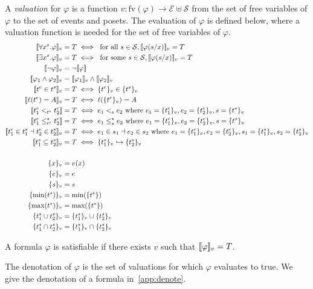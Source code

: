 A \emph{valuation} for $\varphi$ is a function
$v:\text{fv}(\varphi)\to\mathcal{E}\uplus\mathcal{S}$
from the set of free variables of $\varphi$ to the set of events and posets.
%
The evaluation of $\varphi$ is defined below, where a valuation function is needed for the set of free variables of $\varphi$.
\begin{align*}
  \enc{\forall x^s.\varphi}_{v} &= T \iff\text{ for all }s\in\mathcal{S}, \enc{\varphi(s/x)}_{v} = T\\
  \enc{\exists x^s.\varphi}_{v} &= T \iff\text{ for some }s\in\mathcal{S}, \enc{\varphi(s/x)}_{v} = T\\
  \enc{\neg\varphi}_v &= \neg\enc{\varphi} \\
  \enc{\varphi_1\wedge\varphi_2}_v &= \enc{\varphi_1}_v\wedge\enc{\varphi_2}_v\\
  \enc{t^e\in t^s}_v &= T\iff\enct{t^e}_v\in\enct{t^s}_v\\
  \enc{\labl(t^e) = A}_v &= T\iff\labl(\enct{t^e}_v)=A\\
  \enc{t^e_1 <_{t^s} t^e_2} &= T\iff e_1 <_s e_2\text{ where }e_1 = \enct{t^e_1}_v,e_2 = \enct{t^e_2}_v,s = \enct{t^s}_v\\
  \enc{t^e_1 \tleq_{t^s} t^e_2} &= T\iff e_1 \tleq_s e_2\text{ where }e_1 = \enct{t^e_1}_v,e_2 = \enct{t^e_2}_v,s = \enct{t^s}_v\\
  \enc{t^e_1\in t^s_1 \dashv t^e_2\in t^s_2}_v &= T\iff e_1\in s_1 \dashv e_2\in s_2\text{ where }
  e_1 = \enct{t^e_1}_v,e_2 = \enct{t^e_2}_v,s_1 = \enct{t^s_1}_v,s_2 = \enct{t^s_2}_v\\
  \enc{t^s_1\subseteq t^s_2}_v &= T\iff\enct{t^s_1}_v\emb \enct{t^s_2}_v\\
  \\
  \enct{x}_{v} &= v(x)\\
  \enct{e}_{v} &= e\\
  \enct{s}_{v} &= s\\
  \enct{\text{min}(t^s)}_{v} &= \text{min}(\enct{t^s})\\
  \enct{\text{max}(t^s)}_{v} &= \text{max}(\enct{t^s})\\
  \enct{t^s_1 \cup t^s_2}_{v} &= \enct{t^s_1}_v \cup \enct{t^s_2}_{v}\\
  \enct{t^s_1 \cap t^s_2}_{v} &= \enct{t^s_1}_v \cap \enct{t^s_2}_{v}\\
\end{align*}

A formula $\varphi$ is satisfiable if there exists $v$ such that $[\![\varphi]\!]_v = T$.

The denotation of $\varphi$ is the set of valuations for which $\varphi$ evaluates to true. We give the denotation of a formula in~\autoref{app:denote}.
